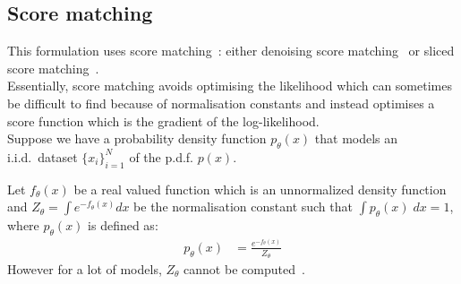 \documentclass{article}
\numberwithin{equation}{section}
\numberwithin{figure}{section}
\begin{document}
\subsection{Score matching}
This formulation uses score matching~\cite{hyvarinen2005}: either denoising score matching~\cite{vincent2010denoising} or sliced score matching~\cite{song2019sliced}. \\
Essentially, score matching avoids optimising the likelihood which can sometimes be difficult to find because of normalisation constants and instead optimises a score function which is the gradient of the log-likelihood. \\
Suppose we have a probability density function $p_\theta (x)$ that models an i.i.d.\ dataset $\{x_i\}_{i=1}^N$ of the p.d.f. $p(x)$. 

Let $f_\theta (x)$ be a real valued function which is an unnormalized density function and $Z_\theta = \int e^{-f_\theta (x)} dx$ be the normalisation constant such that $\int p_\theta (x) \; dx = 1$, where $p_\theta(x)$ is defined as:
\begin{align}
  p_\theta (x) &= \frac{e^{-f_\theta (x)}}{Z_\theta}
\end{align}
However for a lot of models, $Z_\theta$ cannot be computed~\cite{luo2022understanding}. \\
\end{document}
